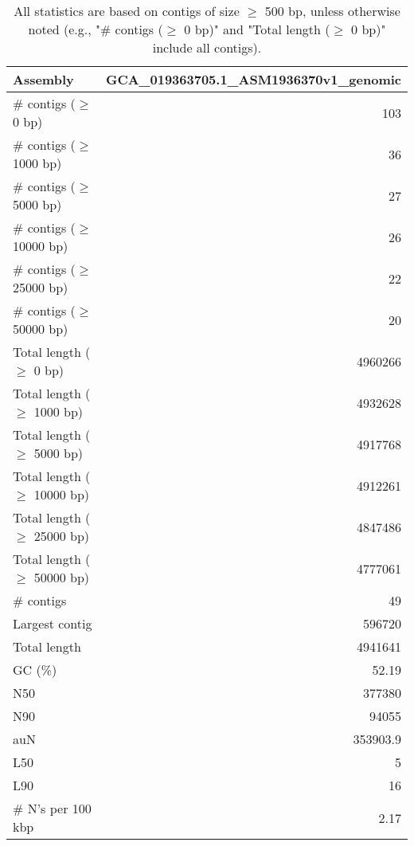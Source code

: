 \documentclass[12pt,a4paper]{article}
\begin{document}
\begin{table}[ht]
\begin{center}
\caption{All statistics are based on contigs of size $\geq$ 500 bp, unless otherwise noted (e.g., "\# contigs ($\geq$ 0 bp)" and "Total length ($\geq$ 0 bp)" include all contigs).}
\begin{tabular}{|l*{1}{|r}|}
\hline
Assembly & GCA\_019363705.1\_ASM1936370v1\_genomic \\ \hline
\# contigs ($\geq$ 0 bp) & 103 \\ \hline
\# contigs ($\geq$ 1000 bp) & 36 \\ \hline
\# contigs ($\geq$ 5000 bp) & 27 \\ \hline
\# contigs ($\geq$ 10000 bp) & 26 \\ \hline
\# contigs ($\geq$ 25000 bp) & 22 \\ \hline
\# contigs ($\geq$ 50000 bp) & 20 \\ \hline
Total length ($\geq$ 0 bp) & 4960266 \\ \hline
Total length ($\geq$ 1000 bp) & 4932628 \\ \hline
Total length ($\geq$ 5000 bp) & 4917768 \\ \hline
Total length ($\geq$ 10000 bp) & 4912261 \\ \hline
Total length ($\geq$ 25000 bp) & 4847486 \\ \hline
Total length ($\geq$ 50000 bp) & 4777061 \\ \hline
\# contigs & 49 \\ \hline
Largest contig & 596720 \\ \hline
Total length & 4941641 \\ \hline
GC (\%) & 52.19 \\ \hline
N50 & 377380 \\ \hline
N90 & 94055 \\ \hline
auN & 353903.9 \\ \hline
L50 & 5 \\ \hline
L90 & 16 \\ \hline
\# N's per 100 kbp & 2.17 \\ \hline
\end{tabular}
\end{center}
\end{table}
\end{document}
